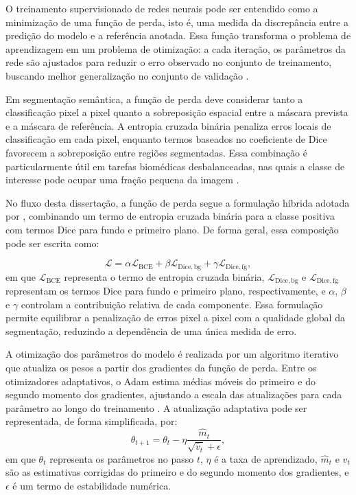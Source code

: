 O treinamento supervisionado de redes neurais pode ser entendido como a
minimização de uma função de perda, isto é, uma medida da discrepância entre a
predição do modelo e a referência anotada. Essa função transforma o problema de
aprendizagem em um problema de otimização: a cada iteração, os parâmetros da rede
são ajustados para reduzir o erro observado no conjunto de treinamento, buscando
melhor generalização no conjunto de validação \cite{goodfellow2016deep}.

Em segmentação semântica, a função de perda deve considerar tanto a
classificação pixel a pixel quanto a sobreposição espacial entre a máscara
prevista e a máscara de referência. A entropia cruzada binária penaliza erros
locais de classificação em cada pixel, enquanto termos baseados no coeficiente
de Dice favorecem a sobreposição entre regiões segmentadas. Essa combinação é
particularmente útil em tarefas biomédicas desbalanceadas, nas quais a classe de
interesse pode ocupar uma fração pequena da imagem \cite{sudre2017generalised}.

No fluxo desta dissertação, a função de perda segue a formulação híbrida adotada
por \textcite{khened2021generalized}, combinando um termo de entropia cruzada
binária para a classe positiva com termos Dice para fundo e primeiro plano. De
forma geral, essa composição pode ser escrita como:

\begin{equation}\label{eq:hybrid-loss}
    \mathcal{L}
    =
    \alpha \mathcal{L}_{\mathrm{BCE}}
    +
    \beta \mathcal{L}_{\mathrm{Dice,bg}}
    +
    \gamma \mathcal{L}_{\mathrm{Dice,fg}},
\end{equation}
em que $\mathcal{L}_{\mathrm{BCE}}$ representa o termo de entropia cruzada
binária, $\mathcal{L}_{\mathrm{Dice,bg}}$ e
$\mathcal{L}_{\mathrm{Dice,fg}}$ representam os termos Dice para fundo e
primeiro plano, respectivamente, e $\alpha$, $\beta$ e $\gamma$ controlam a
contribuição relativa de cada componente. Essa formulação permite equilibrar a
penalização de erros pixel a pixel com a qualidade global da segmentação,
reduzindo a dependência de uma única medida de erro.

A otimização dos parâmetros do modelo é realizada por um algoritmo iterativo que atualiza os pesos a partir dos gradientes da função de perda. Entre os
otimizadores adaptativos, o Adam estima médias móveis do primeiro e do segundo
momento dos gradientes, ajustando a escala das atualizações para cada parâmetro
ao longo do treinamento \cite{kingma2015adam}. A atualização adaptativa pode ser representada, de forma simplificada, por:
\begin{equation}\label{eq:adam-update}
    \theta_{t+1}
    =
    \theta_t
    -
    \eta
    \frac{\hat{m}_t}{\sqrt{\hat{v}_t}+\epsilon},
\end{equation}
em que $\theta_t$ representa os parâmetros no passo $t$, $\eta$ é a taxa de
aprendizado, $\hat{m}_t$ e $\hat{v}_t$ são as estimativas corrigidas do primeiro e do segundo momento dos gradientes, e $\epsilon$ é um termo de estabilidade numérica.

